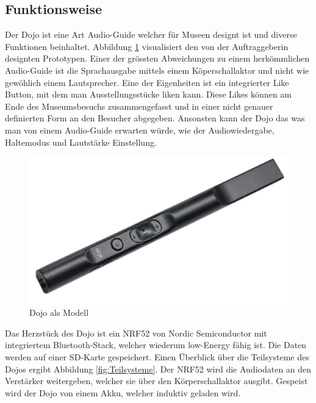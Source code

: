 \subsection{Funktionsweise} \label{sec:funktionsweise}

Der Dojo ist eine Art Audio-Guide welcher für Museen designt ist und diverse Funktionen beinhaltet. Abbildung \ref{fig:Funktion Dojo} visualisiert den von der Auftraggeberin designten Prototypen. Einer der grössten Abweichungen zu einem herkömmlichen Audio-Guide ist die Sprachausgabe mittels einem Köperschallaktor und nicht wie gewöhlich einem Lautsprecher. Eine der Eigenheiten ist ein integrierter Like Button, mit dem man Ausstellungsstücke \glqq liken \grqq kann. Diese Likes können am Ende des Museumsbesuchs zusammengefasst und in einer nicht genauer definierten Form an den Besucher abgegeben. Ansonsten kann der Dojo das was man von einem Audio-Guide erwarten würde, wie der Audiowiedergabe, Haltemodus und Lautstärke Einstellung.

\begin{figure}[H]
	\begin{center}
		\includegraphics[width=140mm]{data/Dojo.png}
		\caption[Dojo als Modell]{Dojo als Modell} %
		\label{fig:Funktion Dojo}
	\end{center}
\end{figure}

Das Herzstück des Dojo ist ein NRF52 von Nordic Semiconductor mit integriertem Bluetooth-Stack, welcher wiederum low-Energy fähig ist. Die Daten werden auf einer SD-Karte gespeichert. Einen Überblick über die Teilsysteme des Dojos ergibt Abbildung \ref{fig:Teilsysteme}. Der NRF52 wird die Audiodaten an den Verstärker weitergeben, welcher sie über den Körperschallaktor ausgibt. Gespeist wird der Dojo von einem Akku, welcher induktiv geladen wird.

